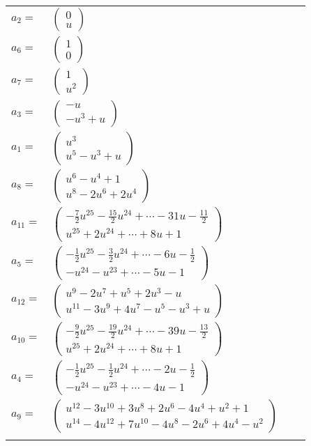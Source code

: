 \documentclass[1p]{elsarticle_modified}
\theoremstyle{definition}
\begin{document}
\begin{tabular}{m{7pt} m{180pt} m{7pt} m{180pt} }
\flushright $a_{2}=$&$\begin{pmatrix}0\\u\end{pmatrix}$ \\
\flushright $a_{6}=$&$\begin{pmatrix}1\\0\end{pmatrix}$ \\
\flushright $a_{7}=$&$\begin{pmatrix}1\\u^2\end{pmatrix}$ \\
\flushright $a_{3}=$&$\begin{pmatrix}- u\\- u^3+u\end{pmatrix}$ \\
\flushright $a_{1}=$&$\begin{pmatrix}u^3\\u^5- u^3+u\end{pmatrix}$ \\
\flushright $a_{8}=$&$\begin{pmatrix}u^6- u^4+1\\u^8-2 u^6+2 u^4\end{pmatrix}$ \\
\flushright $a_{11}=$&$\begin{pmatrix}-\frac{7}{2} u^{25}-\frac{15}{2} u^{24}+\cdots-31 u-\frac{11}{2}\\u^{25}+2 u^{24}+\cdots+8 u+1\end{pmatrix}$ \\
\flushright $a_{5}=$&$\begin{pmatrix}-\frac{1}{2} u^{25}-\frac{3}{2} u^{24}+\cdots-6 u-\frac{1}{2}\\- u^{24}- u^{23}+\cdots-5 u-1\end{pmatrix}$ \\
\flushright $a_{12}=$&$\begin{pmatrix}u^9-2 u^7+u^5+2 u^3- u\\u^{11}-3 u^9+4 u^7- u^5- u^3+u\end{pmatrix}$ \\
\flushright $a_{10}=$&$\begin{pmatrix}-\frac{9}{2} u^{25}-\frac{19}{2} u^{24}+\cdots-39 u-\frac{13}{2}\\u^{25}+2 u^{24}+\cdots+8 u+1\end{pmatrix}$ \\
\flushright $a_{4}=$&$\begin{pmatrix}-\frac{1}{2} u^{25}-\frac{1}{2} u^{24}+\cdots-2 u-\frac{1}{2}\\- u^{24}- u^{23}+\cdots-4 u-1\end{pmatrix}$ \\
\flushright $a_{9}=$&$\begin{pmatrix}u^{12}-3 u^{10}+3 u^8+2 u^6-4 u^4+u^2+1\\u^{14}-4 u^{12}+7 u^{10}-4 u^8-2 u^6+4 u^4- u^2\end{pmatrix}$\\&\end{tabular}
\end{document}
